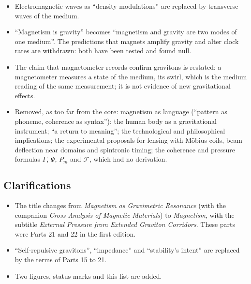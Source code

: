 \documentclass[11pt,a4paper]{article}
\begin{document}
\begin{itemize}
\item Electromagnetic waves as ``density modulations'' are replaced by transverse waves of the medium.
\item ``Magnetism is gravity'' becomes ``magnetism and gravity are two modes of one medium''. The predictions that magnets amplify gravity and alter clock rates are withdrawn: both have been tested and found null.
\item The claim that magnetometer records confirm gravitons is restated: a magnetometer measures a state of the medium, its swirl, which is the medium reading of the same measurement; it is not evidence of new gravitational effects.
\item Removed, as too far from the core: magnetism as language (``pattern as phoneme, coherence as syntax''); the human body as a gravitational instrument; ``a return to meaning''; the technological and philosophical implications; the experimental proposals for lensing with Möbius coils, beam deflection near domains and spintronic timing; the coherence and pressure formulas $\Gamma$, $\Psi$, $P_m$ and $\mathcal{F}$, which had no derivation.
\end{itemize}

\subsection*{Clarifications}
\begin{itemize}
\item The title changes from \emph{Magnetism as Gravimetric Resonance} (with the companion \emph{Cross-Analysis of Magnetic Materials}) to \emph{Magnetism}, with the subtitle \emph{External Pressure from Extended Graviton Corridors}. These parts were Parts 21 and 22 in the first edition.
\item ``Self-repulsive gravitons'', ``impedance'' and ``stability's intent'' are replaced by the terms of Parts 15 to 21.
\item Two figures, status marks and this list are added.
\end{itemize}

\newpage


\end{document}
